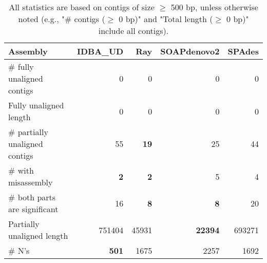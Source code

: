 \documentclass[12pt,a4paper]{article}
\begin{document}
\begin{table}[ht]
\begin{center}
\caption{All statistics are based on contigs of size $\geq$ 500 bp, unless otherwise noted (e.g., "\# contigs ($\geq$ 0 bp)" and "Total length ($\geq$ 0 bp)" include all contigs).}
\begin{tabular}{|l*{4}{|r}|}
\hline
Assembly & IDBA\_UD & Ray & SOAPdenovo2 & SPAdes \\ \hline
\# fully unaligned contigs & 0 & 0 & 0 & 0 \\ \hline
Fully unaligned length & 0 & 0 & 0 & 0 \\ \hline
\# partially unaligned contigs & 55 & {\bf 19} & 25 & 44 \\ \hline
\hspace{5mm}\# with misassembly & {\bf 2} & {\bf 2} & 5 & 4 \\ \hline
\hspace{5mm}\# both parts are significant & 16 & {\bf 8} & {\bf 8} & 20 \\ \hline
Partially unaligned length & 751404 & 45931 & {\bf 22394} & 693271 \\ \hline
\# N's & {\bf 501} & 1675 & 2257 & 1692 \\ \hline
\end{tabular}
\end{center}
\end{table}
\end{document}
